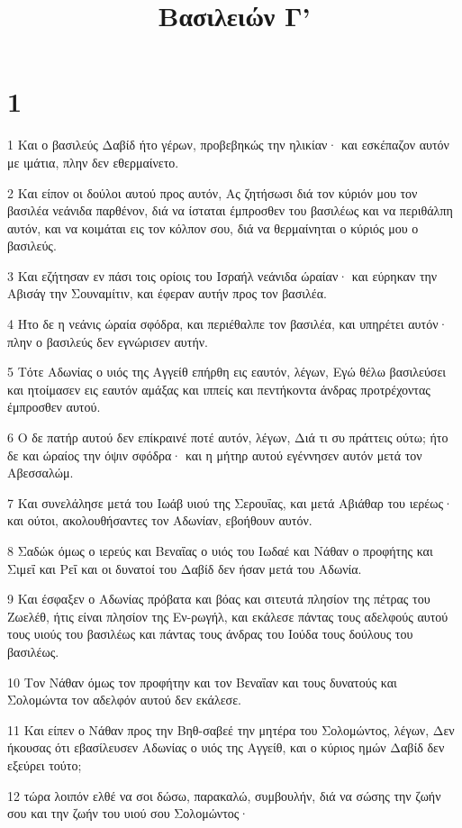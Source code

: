 

\title{Βασιλειών Γ'}


\chapter{1}

\par 1 Και ο βασιλεύς Δαβίδ ήτο γέρων, προβεβηκώς την ηλικίαν· και εσκέπαζον αυτόν με ιμάτια, πλην δεν εθερμαίνετο.
\par 2 Και είπον οι δούλοι αυτού προς αυτόν, Ας ζητήσωσι διά τον κύριόν μου τον βασιλέα νεάνιδα παρθένον, διά να ίσταται έμπροσθεν του βασιλέως και να περιθάλπη αυτόν, και να κοιμάται εις τον κόλπον σου, διά να θερμαίνηται ο κύριός μου ο βασιλεύς.
\par 3 Και εζήτησαν εν πάσι τοις ορίοις του Ισραήλ νεάνιδα ώραίαν· και εύρηκαν την Αβισάγ την Σουναμίτιν, και έφεραν αυτήν προς τον βασιλέα.
\par 4 Ήτο δε η νεάνις ώραία σφόδρα, και περιέθαλπε τον βασιλέα, και υπηρέτει αυτόν· πλην ο βασιλεύς δεν εγνώρισεν αυτήν.
\par 5 Τότε Αδωνίας ο υιός της Αγγείθ επήρθη εις εαυτόν, λέγων, Εγώ θέλω βασιλεύσει και ητοίμασεν εις εαυτόν αμάξας και ιππείς και πεντήκοντα άνδρας προτρέχοντας έμπροσθεν αυτού.
\par 6 Ο δε πατήρ αυτού δεν επίκραινέ ποτέ αυτόν, λέγων, Διά τι συ πράττεις ούτω; ήτο δε και ώραίος την όψιν σφόδρα· και η μήτηρ αυτού εγέννησεν αυτόν μετά τον Αβεσσαλώμ.
\par 7 Και συνελάλησε μετά του Ιωάβ υιού της Σερουΐας, και μετά Αβιάθαρ του ιερέως· και ούτοι, ακολουθήσαντες τον Αδωνίαν, εβοήθουν αυτόν.
\par 8 Σαδώκ όμως ο ιερεύς και Βεναΐας ο υιός του Ιωδαέ και Νάθαν ο προφήτης και Σιμεΐ και Ρεΐ και οι δυνατοί του Δαβίδ δεν ήσαν μετά του Αδωνία.
\par 9 Και έσφαξεν ο Αδωνίας πρόβατα και βόας και σιτευτά πλησίον της πέτρας του Ζωελέθ, ήτις είναι πλησίον της Εν-ρωγήλ, και εκάλεσε πάντας τους αδελφούς αυτού τους υιούς του βασιλέως και πάντας τους άνδρας του Ιούδα τους δούλους του βασιλέως.
\par 10 Τον Νάθαν όμως τον προφήτην και τον Βεναΐαν και τους δυνατούς και Σολομώντα τον αδελφόν αυτού δεν εκάλεσε.
\par 11 Και είπεν ο Νάθαν προς την Βηθ-σαβεέ την μητέρα του Σολομώντος, λέγων, Δεν ήκουσας ότι εβασίλευσεν Αδωνίας ο υιός της Αγγείθ, και ο κύριος ημών Δαβίδ δεν εξεύρει τούτο;
\par 12 τώρα λοιπόν ελθέ να σοι δώσω, παρακαλώ, συμβουλήν, διά να σώσης την ζωήν σου και την ζωήν του υιού σου Σολομώντος·
